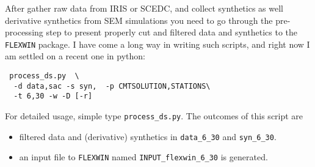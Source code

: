 \documentclass[12pt,titlepage,fleqn]{article}
\begin{document}
After gather raw data from IRIS or SCEDC, and collect synthetics as well derivative synthetics from SEM simulations you need to go through the pre-processing step to present properly cut and filtered data and synthetics to the \verb=FLEXWIN= package. I have come a long way in writing such scripts, and right now I am settled on a recent one in python:
\begin{verbatim}
 process_ds.py  \
  -d data,sac -s syn,  -p CMTSOLUTION,STATIONS\
  -t 6,30 -w -D [-r]
\end{verbatim}
For detailed usage, simple type \verb+process_ds.py+. The outcomes of this script are
\begin{itemize}
\item filtered data and (derivative) synthetics in \verb+data_6_30+ and \verb+syn_6_30+. 
\item an input file to \verb+FLEXWIN+ named \verb+INPUT_flexwin_6_30+ is generated.
\end{itemize}
\end{document}
